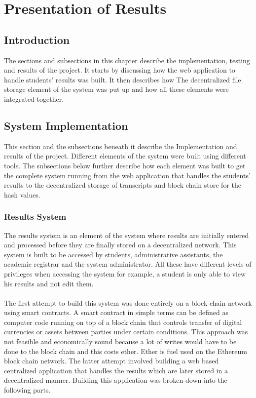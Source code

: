 \chapter{Presentation of Results}
\section{Introduction}
The sections and subsections in this chapter describe the implementation, testing and results of the project. It starts by discussing how the web application to handle students' results was built. It then describes how The decentralized file storage element of the system was put up and how all these elements were integrated together.

\section{System Implementation}
This section and the subsections beneath it describe the Implementation and results of the project. Different elements of the system were built using different tools. The subsections below further describe how each element was built to get the complete system running from the web application that handles the students' results to the decentralized storage of transcripts and block chain store for the hash values.

\subsection{Results System}
The results system is an element of the system where results are initially entered and processed before they are finally stored on a decentralized network. This system is built to be accessed by students, administrative assistants, the academic registrar and the system administrator. All these have different levels of privileges when accessing the system for example, a student is only able to view his results and not edit them. \\~\\
The first attempt to build this system was done entirely on a block chain network using smart contracts. A smart contract in simple terms can be defined as computer code running on top of a block chain that controls transfer of digital currencies or assets between parties under certain conditions\cite{art20}. This approach was not feasible and economically sound because a lot of writes would have to be done to the block chain and this costs ether. Ether is fuel used on the Ethereum block chain network. The latter attempt involved building a web based centralized application that handles the results which are later stored in a decentralized manner. Building this application was broken down into the following parts.

